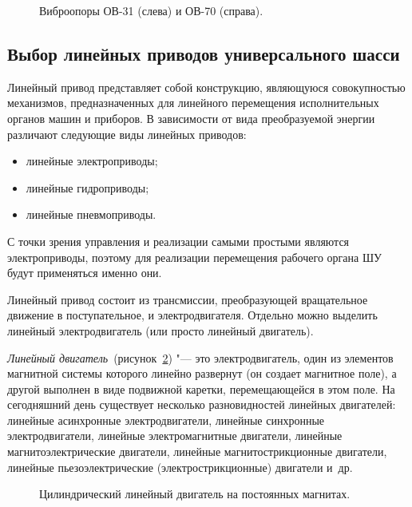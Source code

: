 \begin{figure}[ht]
	\caption{Виброопоры ОВ-31 (слева) и ОВ-70 (справа).}\label{fig:vibro}
\end{figure}

\subsection{Выбор линейных приводов универсального шасси}

Линейный привод представляет собой конструкцию, являющуюся совокупностью механизмов, предназначенных для линейного перемещения исполнительных органов машин и приборов. В зависимости от вида преобразуемой энергии различают следующие виды линейных приводов:

\begin{itemize}
	\item линейные электроприводы;
	
	\item линейные гидроприводы;
	
	\item линейные пневмоприводы.
\end{itemize}

С точки зрения управления и реализации самыми простыми являются электроприводы, поэтому для реализации перемещения рабочего органа ШУ будут применяться именно они.

Линейный привод состоит из трансмиссии, преобразующей вращательное движение в поступательное, и электродвигателя. Отдельно можно выделить линейный электродвигатель (или просто линейный двигатель).

\textit{Линейный двигатель}~(рисунок~\cref{fig:lindrive}) "--- это электродвигатель, один из элементов магнитной системы которого линейно развернут (он создает магнитное поле), а другой выполнен в виде подвижной каретки, перемещающейся в этом поле. На сегодняшний день существует несколько разновидностей линейных двигателей: линейные асинхронные электродвигатели, линейные синхронные электродвигатели, линейные электромагнитные двигатели, линейные магнитоэлектрические двигатели, линейные магнитострикционные двигатели, линейные пьезоэлектрические (электрострикционные) двигатели и~др.

\begin{figure}[ht]
	\caption{Цилиндрический линейный двигатель на постоянных магнитах.}\label{fig:lindrive}
\end{figure}

